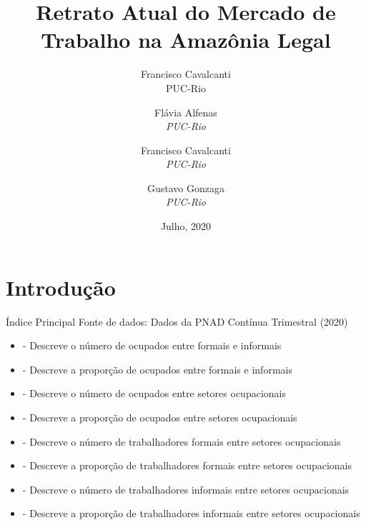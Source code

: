 \documentclass[11pt]{beamer}
\author[Francisco Cavalcanti]{Francisco Cavalcanti\\\footnotesize{PUC-Rio}
}
\author{
Flávia  Alfenas\\
\textit{PUC-Rio}\\ \vspace{3mm}
\and  
Francisco Cavalcanti\\
\textit{PUC-Rio}\\ \vspace{3mm}
\and   
Gustavo Gonzaga \\
\textit{PUC-Rio} 
}
\date{Julho, 2020}
\title{Retrato Atual do Mercado de Trabalho na Amazônia Legal}
\begin{document}

\begin{frame}
\titlepage
\end{frame}


\section{Introdução}

\begin{frame}[label=indice_principal]{Índice Principal}
{\footnotesize Fonte de dados: Dados da PNAD Contínua Trimestral (2020)}
\begin{itemize}  
	
\item{
	\hyperlink{_retrato_emprego_bar_formalidade}{} - {\scriptsize Descreve o número de ocupados entre formais e informais}
	}  

\item{
	\hyperlink{_retrato_emprego_pie_formalidade}{} - {\scriptsize Descreve a proporção de ocupados entre formais e informais}
	}  

\item{
	\hyperlink{_retrato_emprego_bar_n_de_ocupado_gstr}{} - {\scriptsize Descreve o número de ocupados entre setores ocupacionais}
	}  
		
		
\item{
	\hyperlink{_retrato_emprego_pie_n_de_ocupado_gstr}{} - {\scriptsize Descreve a proporção de ocupados entre setores ocupacionais}
	}  
		
\item{
	\hyperlink{_retrato_emprego_bar_n_de_formal_gstr}{} - {\scriptsize Descreve o número de trabalhadores formais entre setores ocupacionais}
	}  
		
		
\item{
	\hyperlink{_retrato_emprego_pie_n_de_formal_gstr}{} - {\scriptsize Descreve a proporção de trabalhadores formais entre setores ocupacionais}
	}  
			

\item{
	\hyperlink{_retrato_emprego_bar_n_de_informal_gstr}{} - {\scriptsize Descreve o número de trabalhadores informais entre setores ocupacionais}
	}  
		
\item{
	\hyperlink{_retrato_emprego_pie_n_de_informal_gstr}{} - {\scriptsize Descreve a proporção de trabalhadores informais entre setores ocupacionais}
	}  		
\end{itemize}

\end{frame}
\end{document}
